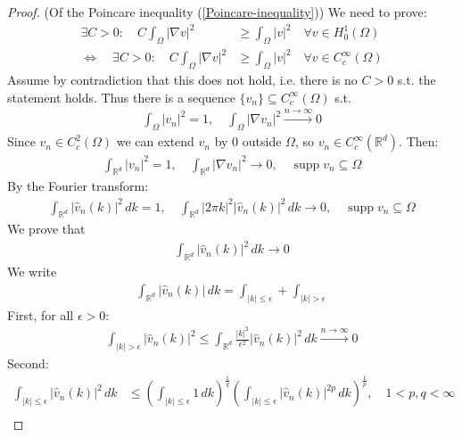 \documentclass{report}
\theoremstyle{tommy}
\newcommand{\supp}{\operatorname{supp}}
\begin{document}
  \begin{proof}(Of the Poincare inequality (\ref{Poincare-inequality}))
    We need to prove: 
    \begin{align*}
      \exists C > 0: \quad C \int_\Omega |\nabla v|^2 &\ge \int_\Omega |v|^2 \quad \forall v \in H_0^1(\Omega)\\
      \Leftrightarrow \quad \exists C > 0: \quad C \int_\Omega |\nabla v|^2 &\ge \int_\Omega |v|^2 \quad \forall v \in C_c^\infty(\Omega)
    \end{align*}
    Assume by contradiction that this does not hold, i.e. there is no \(C > 0\) s.t. the statement holds. Thus there is a sequence \(\{v_n\} \subseteq C_c^\infty(\Omega)\) s.t. 
    \begin{align*}
      \int_\Omega |v_n|^2 = 1, \quad
      \int_\Omega |\nabla v_n |^2 \xrightarrow{n \to \infty} 0
    \end{align*}
    Since \(v_n \in C_c^2(\Omega)\) we can extend \(v_n\) by \(0\) outside \(\Omega\), so \(v_n \in C_c^\infty(\mathbb{R}^d)\). Then:
    \begin{align*}
      \int_{\mathbb{R}^d}|v_n|^2 = 1, \quad \int_{\mathbb{R}^d} |\nabla v_n|^2 \to 0, \quad \supp v_n \subseteq \Omega
    \end{align*}
    By the Fourier transform:
    \begin{align*}
      \int_{\mathbb{R}^d} |\hat v_n(k)|^2 \, dk = 1, \quad 
      \int_{\mathbb{R}^d} |2 \pi k|^2 |\hat v_n(k)|^2 \, dk \to 0, \quad 
      \supp v_n \subseteq \Omega  
    \end{align*}
    We prove that
    \begin{align*}
      \int_{\mathbb{R}^d} |\hat v_n(k)|^2 \, dk \to 0
    \end{align*}
    We write
    \begin{align*}
      \int_{\mathbb{R}^d} |\hat v_n(k)| \, dk = \int_{|k| \le \epsilon} + \int_{|k| > \epsilon}
    \end{align*}
    First, for all \(\epsilon > 0\):
    \begin{align*}
      \int_{|k|> \epsilon} |\hat v_n(k)|^2 \le \int_{\mathbb{R}^d} \frac{|k|^2}{\epsilon^2} |\hat v_n(k)|^2 \, dk \xrightarrow{n \to \infty} 0
    \end{align*}
    Second:
    \begin{align*}
      \int_{|k|\le \epsilon} |\hat v_n(k)|^2 \, dk 
      &\le \left(\int_{|k| \le \epsilon} 1 \, dk\right)^{\frac{1}{q}} \left(\int_{|k|\le \epsilon} |\hat v_n(k)|^{2p} \, dk\right)^{\frac{1}{p}}, \quad 1 < p,q < \infty \\

\end{align*}
\end{proof}
\end{document}
